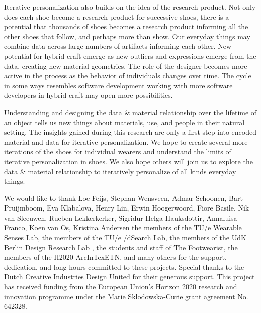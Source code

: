 Iterative personalization also builds on the idea of the research product\cite{Odom2016}. Not only does each shoe become a research product for successive shoes, there is a potential that thousands of shoes becomes a research product informing all the other shoes that follow, and perhaps more than show. Our everyday things may combine data across large numbers of artifacts informing each other. New potential for hybrid craft emerge as new outliers and expressions emerge from the data, creating new material geometries. The role of the designer becomes more active in the process as the behavior of individuals changes over time. The cycle in some ways resembles software development working with more software developers in hybrid craft may open more possibilities. 

Understanding and designing the data \& material relationship over the lifetime of an object tells us new things about materials, use, and people in their natural setting. 
The insights gained during this research are only a first step into encoded material and data for iterative personalization. We hope to create several more iterations of the shoes for individual wearers and understand the limits of iterative personalization in shoes. We also hope others will join us to explore the data \& material relationship to iteratively personalize of all kinds everyday things.  


\begin{acks}
We would like to thank Loe Feijs, Stephan Wensveen, Admar Schoonen, Bart Pruijmboom, Eva Klabalova, Henry Lin, Erwin Hoogerwoord, Fiore Basile, Nik van Sleeuwen, Rueben Lekkerkerker, Sigridur Helga Hauksdottir, Annaluisa Franco, Koen van Os, Kristina Andersen the members of the TU/e Wearable Senses Lab, the members of the TU/e /dSearch Lab, the members of the UdK Berlin Design Research Lab , the students and staff of The Footwearist, the members of the H2020 ArcInTexETN, and many others for the support, dedication, and long hours committed to these projects. Special thanks to the Dutch Creative Industries Design United for their generous support. This project has received funding from the European Union's Horizon 2020 research and innovation programme under the Marie Sklodowska-Curie grant agreement No. 642328.
\end{acks}
